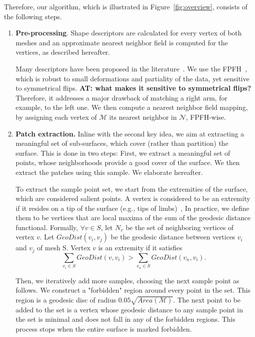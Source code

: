 \documentclass[10pt,twocolumn,letterpaper]{article}
\newcommand{\colornote}[3]{{\color{#1}\bf{#2: #3}\normalfont}}
\newcommand{\colornote}[3]{}
\newcommand {\ayellet}[1]{\colornote{blue}{AT}{#1}}
\begin{document}
Therefore, our algorithm, which is illustrated in Figure~\ref{fig:overview}, consists of the following steps.
\begin{enumerate}
    \item 
    \textbf{Pre-processing}.
    Shape descriptors are calculated for every vertex of both meshes and an approximate nearest neighbor field is computed for the vertices, as described hereafter.
    
    Many descriptors have been proposed in the literature~\cite{rusu2008towards,tombari2010unique,Sun:2009:CPI:1735603.1735621}.
    We use the FPFH~\cite{rusu2009fast}, which is robust to small deformations and partiality of the data, yet sensitive to symmetrical flips.
    \ayellet{what makes it sensitive to symmetrical flips?}
    Therefore, it addresses a major drawback of matching a right arm, for example, to the left one.
    We then compute a nearest neighbor field mapping, by assigning each vertex of $\mathcal{M}$ its nearest neighbor in $\mathcal{N}$, FPFH-wise.

    \item
    {\bf Patch extraction.} 
    Inline with the second key idea, we aim at extracting a meaningful set of sub-surfaces, which cover (rather than partition) the surface.
    This is done in two steps:
    First, we extract a meaningful set of points, whose neighborhoods provide a good cover of the surface. 
    We then extract the patches using this sample.
    We elaborate hereafter.
    
    To extract the sample point set, we start from the extremities of the surface, which are considered salient points.
    A vertex is considered to be an extremity if it  resides on a tip of the surface (e.g.,  tips of limbs)~\cite{katz2005mesh},
    In practice, we define them to be vertices that are local maxima of the sum of the geodesic distance functional.
    Formally, $\forall v \in S$,  let $N_v$ be the set of neighboring vertices of vertex $v$. 
    Let $GeoDist(v_i, v_j)$ be the geodesic distance between vertices $v_i$ and $v_j$ of mesh S. Vertex $v$ is an extremity if it satisfies
     \begin{equation}
        \sum_{v_i\in S} GeoDist(v,v_i)>\sum_{v_n\in S} GeoDist(v_n, v_i).
        \label{eq:extremities}
    \end{equation}

    Then, we iteratively add more samples, choosing the next sample point as follows.
    We construct a "forbidden" region around every point in the set.
    This region is a geodesic disc of radius $ 0.05\sqrt{Area(\mathcal{M})}$.
    The next point to be added to the set is a vertex whose geodesic distance to any sample point in the set is minimal and does not fall in any of the forbidden regions.
    This process stops when the entire surface is marked forbidden. 


\end{enumerate}
\end{document}
